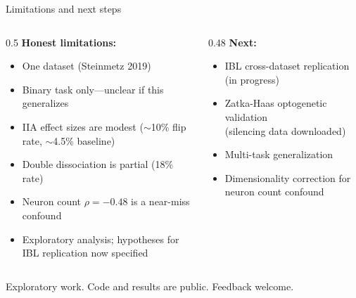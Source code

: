 \documentclass[aspectratio=169,11pt]{beamer}
\begin{document}
\begin{frame}{Limitations and next steps}
\begin{columns}[T]
\begin{column}{0.5\textwidth}
\textbf{Honest limitations:}
\begin{itemize}
  \item One dataset (Steinmetz 2019)
  \item Binary task only---unclear if this generalizes
  \item IIA effect sizes are modest ($\sim$10\% flip rate, $\sim$4.5\% baseline)
  \item Double dissociation is partial (18\% rate)
  \item Neuron count $\rho = -0.48$ is a near-miss confound
  \item Exploratory analysis; hypotheses for IBL replication now specified
\end{itemize}
\end{column}
\begin{column}{0.48\textwidth}
\textbf{Next:}
\begin{itemize}
  \item IBL cross-dataset replication (in progress)
  \item Zatka-Haas optogenetic validation \\
    {\small (silencing data downloaded)}
  \item Multi-task generalization
  \item Dimensionality correction for neuron count confound
\end{itemize}
\end{column}
\end{columns}

\vspace{0.8em}
Exploratory work. Code and results are public. Feedback welcome.
\end{frame}

\end{document}
